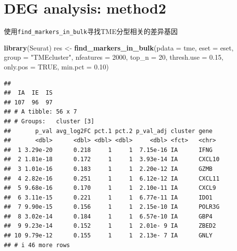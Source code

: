 \documentclass[
  12pt,
]{book}
\newenvironment{Shaded}{\begin{snugshade}}{\end{snugshade}}
\newcommand{\AttributeTok}[1]{\textcolor[rgb]{0.13,0.29,0.53}{#1}}
\newcommand{\ConstantTok}[1]{\textcolor[rgb]{0.56,0.35,0.01}{#1}}
\newcommand{\DecValTok}[1]{\textcolor[rgb]{0.00,0.00,0.81}{#1}}
\newcommand{\FloatTok}[1]{\textcolor[rgb]{0.00,0.00,0.81}{#1}}
\newcommand{\FunctionTok}[1]{\textcolor[rgb]{0.13,0.29,0.53}{\textbf{#1}}}
\newcommand{\NormalTok}[1]{#1}
\newcommand{\OtherTok}[1]{\textcolor[rgb]{0.56,0.35,0.01}{#1}}
\newcommand{\SpecialCharTok}[1]{\textcolor[rgb]{0.81,0.36,0.00}{\textbf{#1}}}
\newcommand{\StringTok}[1]{\textcolor[rgb]{0.31,0.60,0.02}{#1}}
\begin{document}
\hypertarget{deg-analysis-method2}{%
\section{DEG analysis: method2}\label{deg-analysis-method2}}

使用\texttt{find\_markers\_in\_bulk}寻找TME分型相关的差异基因

\begin{Shaded}
\begin{Highlighting}[]
\FunctionTok{library}\NormalTok{(Seurat)}
\NormalTok{res }\OtherTok{\textless{}{-}} \FunctionTok{find\_markers\_in\_bulk}\NormalTok{(}\AttributeTok{pdata      =}\NormalTok{ tme, }
                            \AttributeTok{eset       =}\NormalTok{ eset, }
                            \AttributeTok{group      =} \StringTok{"TMEcluster"}\NormalTok{, }
                            \AttributeTok{nfeatures  =} \DecValTok{2000}\NormalTok{, }
                            \AttributeTok{top\_n      =} \DecValTok{20}\NormalTok{, }
                            \AttributeTok{thresh.use =} \FloatTok{0.15}\NormalTok{, }
                            \AttributeTok{only.pos   =} \ConstantTok{TRUE}\NormalTok{, }
                            \AttributeTok{min.pct    =} \FloatTok{0.10}\NormalTok{)}
\end{Highlighting}
\end{Shaded}

\begin{verbatim}
## 
##  IA  IE  IS 
## 107  96  97 
## # A tibble: 56 x 7
## # Groups:   cluster [3]
##       p_val avg_log2FC pct.1 pct.2 p_val_adj cluster gene  
##       <dbl>      <dbl> <dbl> <dbl>     <dbl> <fct>   <chr> 
##  1 3.29e-20      0.218     1     1  7.15e-16 IA      IFNG  
##  2 1.81e-18      0.172     1     1  3.93e-14 IA      CXCL10
##  3 1.01e-16      0.183     1     1  2.20e-12 IA      GZMB  
##  4 2.82e-16      0.251     1     1  6.12e-12 IA      CXCL11
##  5 9.68e-16      0.170     1     1  2.10e-11 IA      CXCL9 
##  6 3.11e-15      0.221     1     1  6.77e-11 IA      IDO1  
##  7 9.90e-15      0.156     1     1  2.15e-10 IA      POLR3G
##  8 3.02e-14      0.184     1     1  6.57e-10 IA      GBP4  
##  9 9.23e-14      0.152     1     1  2.01e- 9 IA      ZBED2 
## 10 9.79e-12      0.155     1     1  2.13e- 7 IA      GNLY  
## # i 46 more rows
\end{verbatim}

\begin{Shaded}
\end{Shaded}
\end{document}
